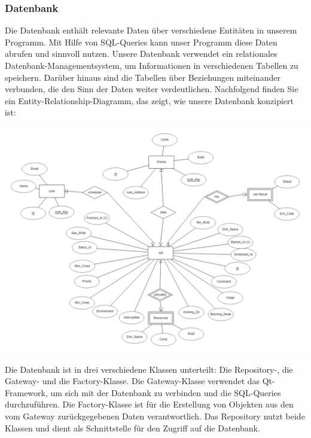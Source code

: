 \documentclass[a4paper,12pt]{article}
\begin{document}
\subsubsection{Datenbank}

	Die Datenbank enthält relevante Daten über verschiedene Entitäten in unserem Programm. Mit Hilfe von SQL-Queries kann unser Programm diese Daten abrufen und sinnvoll nutzen.  Unsere Datenbank verwendet ein relationales Datenbank-Managementsystem, um Informationen in verschiedenen Tabellen zu speichern. Darüber hinaus sind die Tabellen über Beziehungen miteinander verbunden, die den Sinn der Daten weiter verdeutlichen. Nachfolgend finden Sie ein Entity-Relationship-Diagramm, das zeigt, wie unsere Datenbank konzipiert ist:

\includegraphics[width=\textwidth]{database_relational}

\clearpage
Die Datenbank ist in drei verschiedene Klassen unterteilt: Die Repository-, die Gateway- und die Factory-Klasse. Die Gateway-Klasse verwendet das Qt-Framework, um sich mit der Datenbank zu verbinden und die SQL-Queries durchzuführen. Die Factory-Klasse ist für die Erstellung von Objekten aus den vom Gateway zurückgegebenen Daten verantwortlich. Das Repository nutzt beide Klassen und dient als Schnittstelle für den Zugriff auf die Datenbank.\newline
\end{document}
